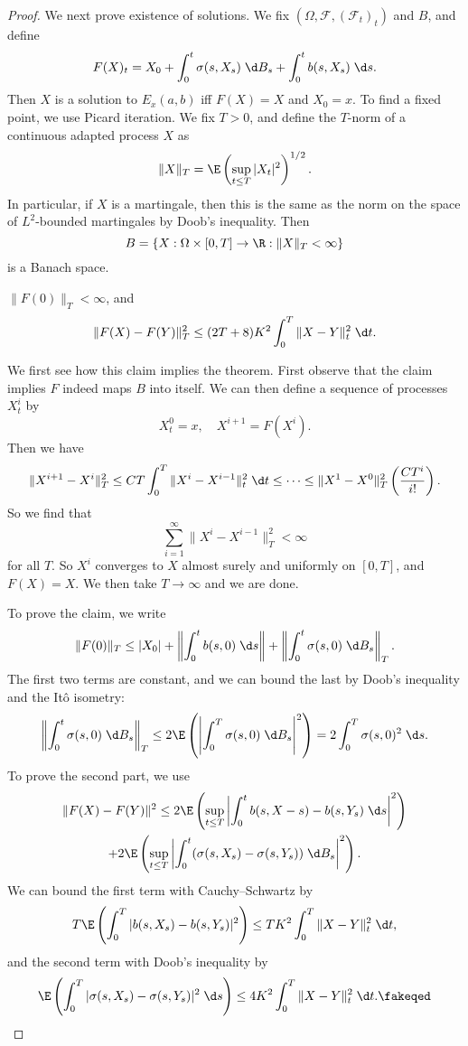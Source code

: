 \documentclass[a4paper]{article}
\begin{document}
\begin{proof}
  We next prove existence of solutions. We fix $(\Omega, \mathcal{F}, (\mathcal{F}_t)_t)$ and $B$, and define
  \[
    F(X)_t = X_0 + \int_0^t \sigma(s, X_s)\;\d B_s + \int_0^t b(s, X_s) \;\d s.
  \]
  Then $X$ is a solution to $E_x(a, b)$ iff $F(X) = X$ and $X_0 = x$. To find a fixed point, we use Picard iteration. We fix $T > 0$, and define the $T$-norm of a continuous adapted process $X$ as
  \[
    \|X\|_T = \E\left(\sup_{t \leq T} |X_t|^2\right)^{1/2}.
  \]
  In particular, if $X$ is a martingale, then this is the same as the norm on the space of $L^2$-bounded martingales by Doob's inequality. Then
  \[
    B = \{X: \Omega \times [0, T] \to \R: \|X\|_T < \infty\}
  \]
  is a Banach space.
  \begin{claim}
    $\|F(0)\|_T < \infty$, and
    \[
      \|F(X) - F(Y)\|_T^2 \leq (2T + 8)K^2 \int_0^T \|X - Y\|_t^2 \;\d t.
    \]
  \end{claim}
  We first see how this claim implies the theorem. First observe that the claim implies $F$ indeed maps $B$ into itself. We can then define a sequence of processes $X^i_t$ by 
  \[
    X_t^0 = x,\quad
    X^{i + 1} = F(X^i).
  \]
  Then we have
  \[
    \|X^{i + 1} - X^i\|_T^2 \leq CT \int_0^T \|X^i - X^{i - 1}\|^2_t \;\d t \leq \cdots \leq \|X^1 - X^0\|^2_T \left(\frac{CT^i}{i!}\right).
  \]
  So we find that
  \[
    \sum_{i = 1}^\infty \|X^i - X^{i - 1}\|_T^2 < \infty
  \]
  for all $T$. So $X^i$ converges to $X$ almost surely and uniformly on $[0, T]$, and $F(X) = X$. We then take $T \to \infty$ and we are done.

  To prove the claim, we write
  \[
    \|F(0)\|_T \leq |X_0| + \left\| \int_0^t b(s, 0) \;\d s\right\| + \left\| \int_0^t \sigma(s, 0) \;\d B_s\right\|_T.
  \]
  The first two terms are constant, and we can bound the last by Doob's inequality and the It\^o isometry:
  \[
    \left\| \int_0^t \sigma(s, 0) \;\d B_s\right\|_T \leq 2 \E \left(\left|\int_0^T \sigma(s, 0) \;\d B_s\right|^2\right) = 2 \int_0^T \sigma(s, 0)^2 \;\d s.
  \]
  To prove the second part, we use
  \begin{multline*}
    \|F(X) - F(Y)\|^2 \leq 2 \E \left(\sup_{t \leq T} \left|\int_0^t b(s, X-s) - b(s, Y_s)\;\d s\right|^2\right) \\
    + 2 \E \left(\sup_{t \leq T} \left|\int_0^t(\sigma(s, X_s) - \sigma(s, Y_s))\;\d B_s\right|^2\right).
  \end{multline*}
  We can bound the first term with Cauchy--Schwartz by
  \[
    T \E \left(\int_0^T |b(s, X_s) - b(s, Y_s)|^2 \right) \leq TK^2 \int_0^T \|X -Y \|_t^2 \;\d t,
  \]
  and the second term with Doob's inequality by
  \[
    \E \left(\int_0^T |\sigma(s, X_s) - \sigma(s, Y_s)|^2 \;\d s\right) \leq 4K^2 \int_0^T \|X - Y\|_t^2\;\d t.\fakeqed%
  \]
\end{proof}
\end{document}
